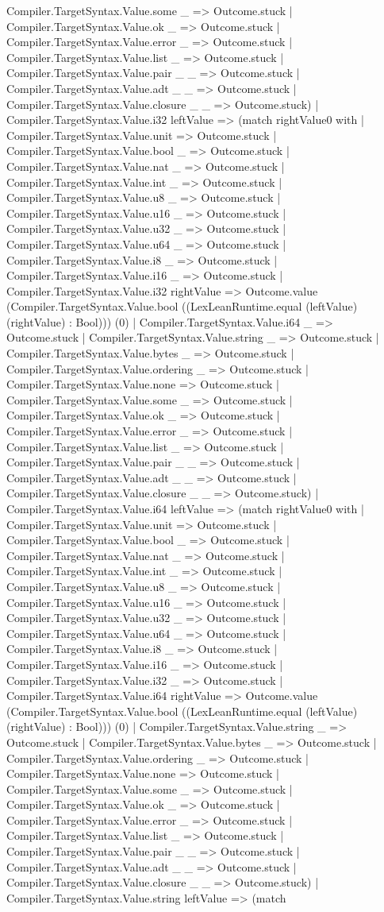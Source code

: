 \documentclass[11pt]{article}
\begin{document}
Compiler.TargetSyntax.Value.some \_ => Outcome.stuck | Compiler.TargetSyntax.Value.ok \_ => Outcome.stuck | Compiler.TargetSyntax.Value.error \_ => Outcome.stuck | Compiler.TargetSyntax.Value.list \_ => Outcome.stuck | Compiler.TargetSyntax.Value.pair \_ \_ => Outcome.stuck | Compiler.TargetSyntax.Value.adt \_ \_ => Outcome.stuck | Compiler.TargetSyntax.Value.closure \_ \_ => Outcome.stuck) | Compiler.TargetSyntax.Value.i32 leftValue => (match rightValue0 with | Compiler.TargetSyntax.Value.unit => Outcome.stuck | Compiler.TargetSyntax.Value.bool \_ => Outcome.stuck | Compiler.TargetSyntax.Value.nat \_ => Outcome.stuck | Compiler.TargetSyntax.Value.int \_ => Outcome.stuck | Compiler.TargetSyntax.Value.u8 \_ => Outcome.stuck | Compiler.TargetSyntax.Value.u16 \_ => Outcome.stuck | Compiler.TargetSyntax.Value.u32 \_ => Outcome.stuck | Compiler.TargetSyntax.Value.u64 \_ => Outcome.stuck | Compiler.TargetSyntax.Value.i8 \_ => Outcome.stuck | Compiler.TargetSyntax.Value.i16 \_ => Outcome.stuck | Compiler.TargetSyntax.Value.i32 rightValue => Outcome.value (Compiler.TargetSyntax.Value.bool ((LexLeanRuntime.equal (leftValue) (rightValue) : Bool))) (0) | Compiler.TargetSyntax.Value.i64 \_ => Outcome.stuck | Compiler.TargetSyntax.Value.string \_ => Outcome.stuck | Compiler.TargetSyntax.Value.bytes \_ => Outcome.stuck | Compiler.TargetSyntax.Value.ordering \_ => Outcome.stuck | Compiler.TargetSyntax.Value.none => Outcome.stuck | Compiler.TargetSyntax.Value.some \_ => Outcome.stuck | Compiler.TargetSyntax.Value.ok \_ => Outcome.stuck | Compiler.TargetSyntax.Value.error \_ => Outcome.stuck | Compiler.TargetSyntax.Value.list \_ => Outcome.stuck | Compiler.TargetSyntax.Value.pair \_ \_ => Outcome.stuck | Compiler.TargetSyntax.Value.adt \_ \_ => Outcome.stuck | Compiler.TargetSyntax.Value.closure \_ \_ => Outcome.stuck) | Compiler.TargetSyntax.Value.i64 leftValue => (match rightValue0 with | Compiler.TargetSyntax.Value.unit => Outcome.stuck | Compiler.TargetSyntax.Value.bool \_ => Outcome.stuck | Compiler.TargetSyntax.Value.nat \_ => Outcome.stuck | Compiler.TargetSyntax.Value.int \_ => Outcome.stuck | Compiler.TargetSyntax.Value.u8 \_ => Outcome.stuck | Compiler.TargetSyntax.Value.u16 \_ => Outcome.stuck | Compiler.TargetSyntax.Value.u32 \_ => Outcome.stuck | Compiler.TargetSyntax.Value.u64 \_ => Outcome.stuck | Compiler.TargetSyntax.Value.i8 \_ => Outcome.stuck | Compiler.TargetSyntax.Value.i16 \_ => Outcome.stuck | Compiler.TargetSyntax.Value.i32 \_ => Outcome.stuck | Compiler.TargetSyntax.Value.i64 rightValue => Outcome.value (Compiler.TargetSyntax.Value.bool ((LexLeanRuntime.equal (leftValue) (rightValue) : Bool))) (0) | Compiler.TargetSyntax.Value.string \_ => Outcome.stuck | Compiler.TargetSyntax.Value.bytes \_ => Outcome.stuck | Compiler.TargetSyntax.Value.ordering \_ => Outcome.stuck | Compiler.TargetSyntax.Value.none => Outcome.stuck | Compiler.TargetSyntax.Value.some \_ => Outcome.stuck | Compiler.TargetSyntax.Value.ok \_ => Outcome.stuck | Compiler.TargetSyntax.Value.error \_ => Outcome.stuck | Compiler.TargetSyntax.Value.list \_ => Outcome.stuck | Compiler.TargetSyntax.Value.pair \_ \_ => Outcome.stuck | Compiler.TargetSyntax.Value.adt \_ \_ => Outcome.stuck | Compiler.TargetSyntax.Value.closure \_ \_ => Outcome.stuck) | Compiler.TargetSyntax.Value.string leftValue => (match 
\end{document}
